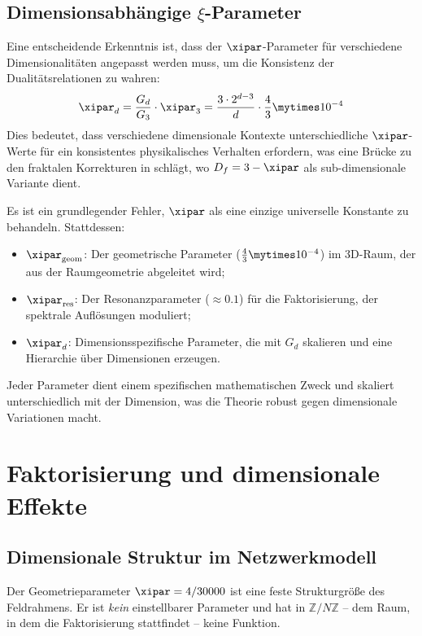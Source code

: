 \subsection{Dimensionsabhängige $\xi$-Parameter}
\label{subsec:dimension_dependent_xi}
Eine entscheidende Erkenntnis ist, dass der $\xipar$-Parameter für verschiedene Dimensionalitäten angepasst werden muss, um die Konsistenz der Dualitätsrelationen zu wahren:
\begin{equation}
	\xipar_d = \frac{G_d}{G_3} \cdot \xipar_3 = \frac{3 \cdot 2^{d-3}}{d} \cdot \frac{4}{3} \mytimes 10^{-4}
\end{equation}
Dies bedeutet, dass verschiedene dimensionale Kontexte unterschiedliche $\xipar$-Werte für ein konsistentes physikalisches Verhalten erfordern, was eine Brücke zu den fraktalen Korrekturen in \cite{T0_g2_erweiterung} schlägt, wo $D_f = 3 - \xipar$ als sub-dimensionale Variante dient.
\begin{revolutionary}
	Es ist ein grundlegender Fehler, $\xipar$ als eine einzige universelle Konstante zu behandeln. Stattdessen:
	\begin{itemize}
		\item $\xipar_{\text{geom}}$: Der geometrische Parameter ($\frac{4}{3} \mytimes 10^{-4}$) im 3D-Raum, der aus der Raumgeometrie abgeleitet wird;
		\item $\xipar_{\text{res}}$: Der Resonanzparameter ($\approx 0.1$) für die Faktorisierung, der spektrale Auflösungen moduliert;
		\item $\xipar_d$: Dimensionsspezifische Parameter, die mit $G_d$ skalieren und eine Hierarchie über Dimensionen erzeugen.
	\end{itemize}
	Jeder Parameter dient einem spezifischen mathematischen Zweck und skaliert unterschiedlich mit der Dimension, was die Theorie robust gegen dimensionale Variationen macht.
\end{revolutionary}
\section{Faktorisierung und dimensionale Effekte}
\label{sec:factorization_dimensional}
\subsection{Dimensionale Struktur im Netzwerkmodell}
\label{subsec:factorization_xi}
Der Geometrieparameter $\xipar = 4/30000$ ist eine feste Strukturgröße des
Feldrahmens. Er ist \emph{kein} einstellbarer Parameter und hat in
$\mathbb{Z}/N\mathbb{Z}$ -- dem Raum, in dem die Faktorisierung stattfindet --
keine Funktion.

